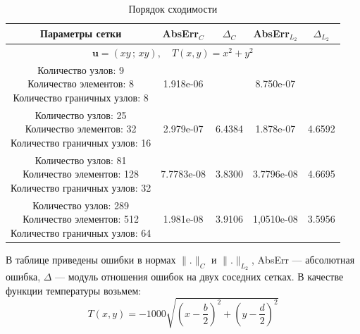 \documentclass[12pt, a4paper]{article}
\begin{document}
\begin{table}[H]
\caption{Порядок сходимости}
\centering
\footnotesize
\begin{tabular}{|c|c|c|c|c|}
	\hline
	Параметры сетки & AbsErr$_{C}$ & $\Delta_C$ & AbsErr$_{L_2}$ & $\Delta_{L_2}$ \\ 
	\hline
	\multicolumn{5}{|c|}{$\mathbf{u} = \left(xy\,;\,xy\right),\quad T(x,y) = x^2+y^2$}\\
	\hline
	\makecell{Количество узлов: 9\\
	 Количество элементов: 8\\ Количество граничных узлов: 8} &1.918e-06&&8.750e-07&\\
		\hline
	\makecell{Количество узлов: 25\\ Количество элементов: 32\\ Количество граничных узлов: 16} &2.979e-07&6.4384&1.878e-07&4.6592\\
		\hline
	\makecell{Количество узлов: 81\\ Количество элементов: 128\\ Количество граничных узлов: 32 } &7.7783e-08&3.8300&3.7796e-08&4.6695\\
		\hline
	\makecell{Количество узлов: 289\\ Количество элементов: 512\\ Количество граничных узлов: 64 } &1.981e-08&3.9106&1,0510e-08 &3.5956\\
		\hline
	
	\end{tabular}
\end{table}
В таблице приведены ошибки в нормах $\|.\|_C$ и $\|.\|_{L_2}$, AbsErr --- абсолютная ошибка, $\Delta$ --- модуль отношения ошибок на двух соседних сетках.
\newpage
В качестве функции температуры возьмем:
\[
T(x,y) = -1000\sqrt{\left(x-\frac{b}{2}\right)^2+\left(y-\frac{d}{2}\right)^2}
\]
\end{document}
